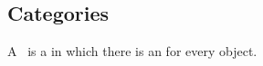 \subsection{Categories}

\begin{ctdefinition}[Category]
    \label{def:categorymain}
    A ~\CatC is a  in which there is an  for every object.
\end{ctdefinition}

